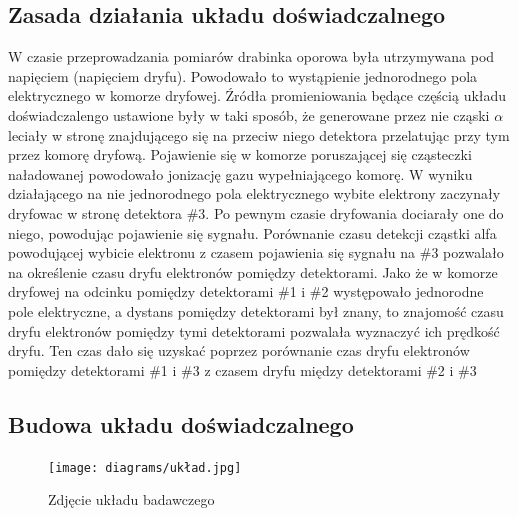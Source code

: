 \documentclass[10pt,a4paper]{article}
\begin{document}
\subsection{Zasada działania układu doświadczalnego}

W czasie przeprowadzania pomiarów drabinka oporowa była utrzymywana pod napięciem (napięciem dryfu). Powodowało to wystąpienie jednorodnego pola elektrycznego w komorze dryfowej. Źródła promieniowania będące częścią układu doświadczalengo ustawione były w taki sposób, że generowane przez nie cząski $\alpha$ leciały w stronę znajdującego się na przeciw niego detektora przelatując przy tym przez komorę dryfową. Pojawienie się w komorze poruszającej się cząsteczki naładowanej powodowało jonizację gazu wypełniającego komorę. W wyniku działającego na nie jednorodnego pola elektrycznego wybite elektrony zaczynały dryfowac w stronę detektora \#3. Po pewnym czasie dryfowania dociarały one do niego, powodując pojawienie się sygnału. Porównanie czasu detekcji cząstki alfa powodującej wybicie elektronu z czasem pojawienia się sygnału na \#3 pozwalało na określenie czasu dryfu elektronów pomiędzy detektorami. Jako że w komorze dryfowej na odcinku pomiędzy detektorami \#1 i \#2 występowało jednorodne pole elektryczne, a dystans pomiędzy detektorami był znany, to znajomość czasu dryfu elektronów pomiędzy tymi detektorami pozwalała wyznaczyć ich prędkość dryfu. Ten czas dało się uzyskać poprzez porównanie czas dryfu elektronów pomiędzy detektorami \#1 i \#3 z czasem dryfu między detektorami \#2 i \#3

\subsection{Budowa układu doświadczalnego}

\begin{figure}[h]
    \centering
    \texttt{[image: diagrams/układ.jpg]}
    \caption{Zdjęcie układu badawczego \cite{opracowanie}}
    \label{zdjacie}
\end{figure}
\end{document}
